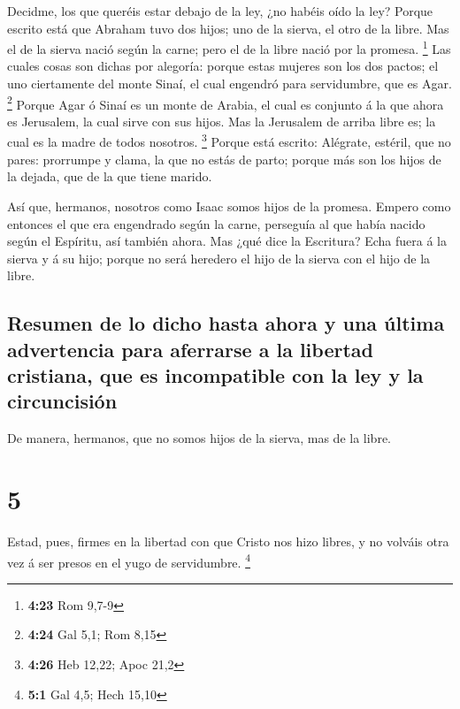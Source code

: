  Decidme, los que queréis estar debajo de la ley, ¿no
habéis oído la ley?  Porque escrito está que Abraham tuvo
dos hijos; uno de la sierva, el otro de la libre.  Mas el
de la sierva nació según la carne; pero el de la libre nació por la
promesa. \footnote{\textbf{4:23} Rom 9,7-9}  Las cuales
cosas son dichas por alegoría: porque estas mujeres son los dos pactos;
el uno ciertamente del monte Sinaí, el cual engendró para servidumbre,
que es Agar. \footnote{\textbf{4:24} Gal 5,1; Rom 8,15} 
Porque Agar ó Sinaí es un monte de Arabia, el cual es conjunto á la que
ahora es Jerusalem, la cual sirve con sus hijos.  Mas la
Jerusalem de arriba libre es; la cual es la madre de todos nosotros.
\footnote{\textbf{4:26} Heb 12,22; Apoc 21,2}  Porque
está escrito: Alégrate, estéril, que no pares: prorrumpe y clama, la que
no estás de parto; porque más son los hijos de la dejada, que de la que
tiene marido.

 Así que, hermanos, nosotros como Isaac somos hijos de la
promesa.  Empero como entonces el que era engendrado
según la carne, perseguía al que había nacido según el Espíritu, así
también ahora.  Mas ¿qué dice la Escritura? Echa fuera á
la sierva y á su hijo; porque no será heredero el hijo de la sierva con
el hijo de la libre.

\hypertarget{resumen-de-lo-dicho-hasta-ahora-y-una-uxfaltima-advertencia-para-aferrarse-a-la-libertad-cristiana-que-es-incompatible-con-la-ley-y-la-circuncisiuxf3n}{%
\subsection{Resumen de lo dicho hasta ahora y una última advertencia
para aferrarse a la libertad cristiana, que es incompatible con la ley y
la
circuncisión}\label{resumen-de-lo-dicho-hasta-ahora-y-una-uxfaltima-advertencia-para-aferrarse-a-la-libertad-cristiana-que-es-incompatible-con-la-ley-y-la-circuncisiuxf3n}}

 De manera, hermanos, que no somos hijos de la sierva,
mas de la libre.

\hypertarget{section-4}{%
\section{5}\label{section-4}}

 Estad, pues, firmes en la libertad con que Cristo nos
hizo libres, y no volváis otra vez á ser presos en el yugo de
servidumbre. \footnote{\textbf{5:1} Gal 4,5; Hech 15,10}

